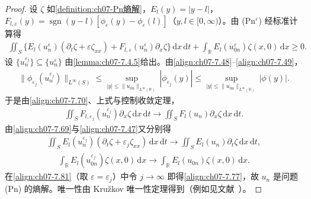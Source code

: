 ﻿\documentclass[../../main.tex]{subfiles}%
\begin{document}
\begin{proof}
设 $\zeta$ 如\cref{definition:ch07-Pn熵解}，$E_l(y)=|y-l|$，$F_{l,\varepsilon}(y)=\operatorname{sgn}(y-l)[\phi_\varepsilon(y)-\phi_\varepsilon(l)]$（$y,l\in[0,\infty)$）。由 (Pn$^\varepsilon$) 经标准计算得
\begin{align}
\iint_S\{E_l(u_n^\varepsilon)(\partial_t\zeta+\varepsilon\zeta_{xx})+F_{l,\varepsilon}(u_n^\varepsilon)\partial_x\zeta\}\,\mathrm{d}x\,\mathrm{d}t
+\int_{\mathbb{R}}E_l(u_{0n}^\varepsilon)\zeta(x,0)\,\mathrm{d}x\geqslant0. \label{align:ch07-7.81}
\end{align}
设 $\{u_n^{\varepsilon_j}\}\subseteq\{u_n^\varepsilon\}$ 由\cref{lemma:ch07-7.4.5}给出。由\eqref{align:ch07-7.48}--\eqref{align:ch07-7.49}，
\begin{align*}
\|\phi_{\varepsilon_j}(u_n^{\varepsilon_j})\|_{L^\infty(S)}
\leqslant\sup_{|y|\leqslant\|u_{0n}\|_{L^\infty(\mathbb{R})}}|\phi_{\varepsilon_j}(y)|
\leqslant\sup_{|y|\leqslant\|u_{0n}\|_{L^\infty(\mathbb{R})}}|\phi(y)|.
\end{align*}
于是由\eqref{align:ch07-7.70}、上式与控制收敛定理，
\begin{align*}
\iint_SF_{l,\varepsilon_j}(u_n^{\varepsilon_j})\partial_x\zeta\,\mathrm{d}x\,\mathrm{d}t
\to\iint_SF_l(u_n)\partial_x\zeta\,\mathrm{d}x\,\mathrm{d}t.
\end{align*}
由\eqref{align:ch07-7.69}与\eqref{align:ch07-7.47}又分别得
\begin{align*}
\iint_SE_l(u_n^{\varepsilon_j})(\partial_t\zeta+\varepsilon_j\zeta_{xx})\,\mathrm{d}x\,\mathrm{d}t
\to\iint_SE_l(u_n)\partial_t\zeta\,\mathrm{d}x\,\mathrm{d}t,
\end{align*}
\begin{align*}
\int_{\mathbb{R}}E_l(u_{0n}^{\varepsilon_j})\zeta(x,0)\,\mathrm{d}x\to\int_{\mathbb{R}}E_l(u_{0n})\zeta(x,0)\,\mathrm{d}x.
\end{align*}
在\eqref{align:ch07-7.81}（取 $\varepsilon=\varepsilon_j$）中令 $j\to\infty$ 即得\eqref{align:ch07-7.77}，故 $u_n$ 是问题 (Pn) 的熵解。唯一性由 Kružkov 唯一性定理得到（例如见文献~\cite{ref91}）。


\end{proof}
\end{document}
